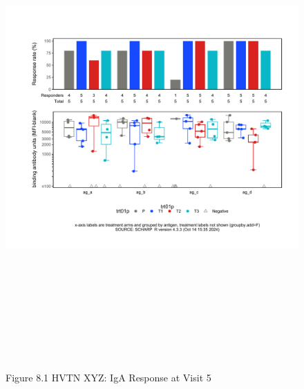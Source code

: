 \documentclass[12pt]{article}
\begin{document}
\begin{figure}[H]

{\centering \includegraphics[width=8.75in,height=7.25in]{test_cases_files/figure-latex/unnamed-chunk-16-1} 

}

\caption[Figure 8.1 boxplot (pos. response boxplots)]{Figure 8.1 HVTN XYZ: IgA Response at Visit 5}\label{fig:unnamed-chunk-16}
\end{figure}
\clearpage
\end{document}
